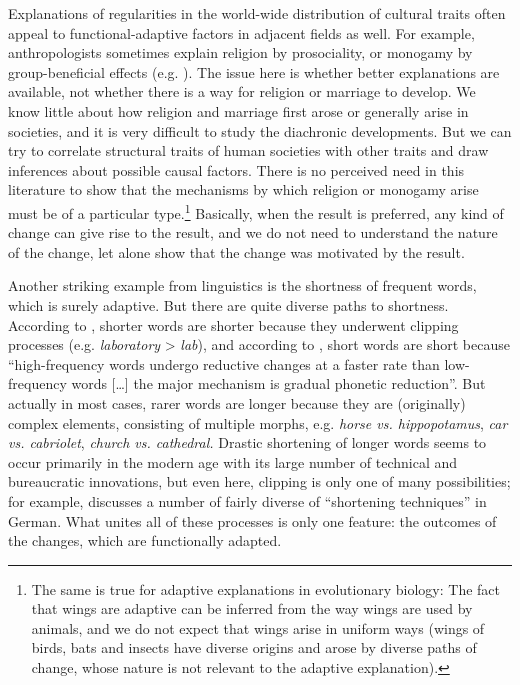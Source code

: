 \documentclass[output=paper]{langsci/langscibook}
\begin{document}
Explanations of regularities in the world-wide distribution of cultural traits often appeal to functional-adaptive factors in adjacent fields as well. For example, anthropologists sometimes explain religion by prosociality, or monogamy by group-beneficial effects (e.g. \citealt{PaciottiEtAl2012,HenrichEtAl2012}). The issue here is whether better explanations are available, not whether there is a way for religion or marriage to develop. We know little about how religion and marriage first arose or generally arise in societies, and it is very difficult to study the diachronic developments. But we can try to correlate structural traits of human societies with other traits and draw inferences about possible causal factors. There is no perceived need in this literature to show that the mechanisms by which religion or monogamy arise must be of a particular type.\footnote{The same is true for adaptive explanations in evolutionary biology: The fact that wings are adaptive can be inferred from the way wings are used by animals, and we do not expect that wings arise in uniform ways (wings of birds, bats and insects have diverse origins and arose by diverse paths of change, whose nature is not relevant to the adaptive explanation).} Basically, when the result is preferred, any kind of change can give rise to the result, and we do not need to understand the nature of the change, let alone show that the change was motivated by the result.

Another striking example from linguistics is the shortness of frequent words, which is surely adaptive. But there are quite diverse paths to shortness. According to \citet{Zipf1935}, shorter words are shorter because they underwent clipping processes (e.g. \textit{laboratory} > \textit{lab}), and according to \citet[12]{Bybee2007}, short words are short because “high-frequency words undergo reductive changes at a faster rate than low-frequency words […] the major mechanism is gradual phonetic reduction”. But actually in most cases, rarer words are longer because they are (originally) complex elements, consisting of multiple morphs, e.g. \textit{horse vs. hippopotamus}, \textit{car vs. cabriolet}, \textit{church vs. cathedral.} Drastic shortening of longer words seems to occur primarily in the modern age with its large number of technical and bureaucratic innovations, but even here, clipping is only one of many possibilities; for example, \citet{RonnebergerSibold2014} discusses a number of fairly diverse of “shortening techniques” in German. What unites all of these processes is only one feature: the outcomes of the changes, which are functionally adapted.
\end{document}
